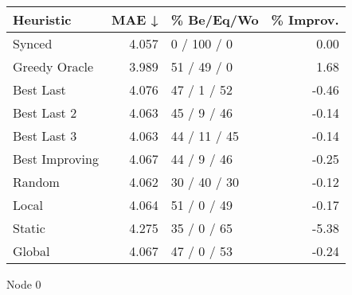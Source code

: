\begin{tabular}{lrlr}
\toprule
\textbf{Heuristic} & \textbf{MAE ↓} & \textbf{\% Be/Eq/Wo} & \textbf{\% Improv.} \\
\midrule
            Synced &          4.057 &          0 / 100 / 0 &                0.00 \\
     Greedy Oracle &          3.989 &          51 / 49 / 0 &                1.68 \\
         Best Last &          4.076 &          47 / 1 / 52 &               -0.46 \\
       Best Last 2 &          4.063 &          45 / 9 / 46 &               -0.14 \\
       Best Last 3 &          4.063 &         44 / 11 / 45 &               -0.14 \\
    Best Improving &          4.067 &          44 / 9 / 46 &               -0.25 \\
            Random &          4.062 &         30 / 40 / 30 &               -0.12 \\
             Local &          4.064 &          51 / 0 / 49 &               -0.17 \\
            Static &          4.275 &          35 / 0 / 65 &               -5.38 \\
            Global &          4.067 &          47 / 0 / 53 &               -0.24 \\
\bottomrule
\end{tabular}
\caption{Node 0}
\label{tab:hr_non_lr01_le2_bs2_0}
